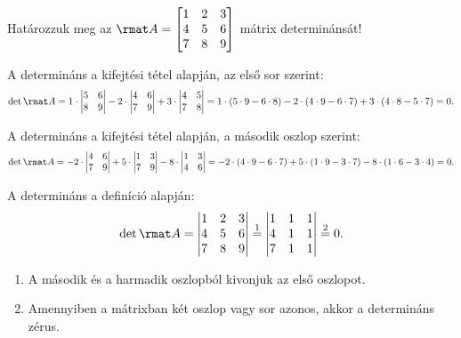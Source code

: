 \documentclass[a4paper, 12pt]{scrartcl}
\begin{document}
\begin{example}
  Határozzuk meg az $\rmat A = \begin{bmatrix}
      1 & 2 & 3 \\
      4 & 5 & 6 \\
      7 & 8 & 9
    \end{bmatrix}$ mátrix determinánsát!

  A determináns a kifejtési tétel alapján, az első sor szerint:
  $$
    \det \rmat A = 1 \cdot \begin{vmatrix}
      5 & 6 \\
      8 & 9
    \end{vmatrix} - 2 \cdot \begin{vmatrix}
      4 & 6 \\
      7 & 9
    \end{vmatrix} + 3 \cdot \begin{vmatrix}
      4 & 5 \\
      7 & 8
    \end{vmatrix}
    = 1 \cdot (5 \cdot 9 - 6 \cdot 8)
    - 2 \cdot (4 \cdot 9 - 6 \cdot 7)
    + 3 \cdot (4 \cdot 8 - 5 \cdot 7)
    = 0
    \text.
  $$

  A determináns a kifejtési tétel alapján, a második oszlop szerint:
  $$
    \det \rmat A = -2 \cdot \begin{vmatrix}
      4 & 6 \\
      7 & 9
    \end{vmatrix} +5 \cdot \begin{vmatrix}
      1 & 3 \\
      7 & 9
    \end{vmatrix} - 8 \cdot \begin{vmatrix}
      1 & 3 \\
      4 & 6
    \end{vmatrix}
    = -2 \cdot (4 \cdot 9 - 6 \cdot 7)
    + 5 \cdot (1 \cdot 9 - 3 \cdot 7)
    - 8 \cdot (1 \cdot 6 - 3 \cdot 4)
    = 0
    \text.
  $$

  A determináns a definíció alapján:
  $$
    \det \rmat A
    = \begin{vmatrix}
      1 & 2 & 3 \\
      4 & 5 & 6 \\
      7 & 8 & 9
    \end{vmatrix}
    \overset{1}{=} \begin{vmatrix}
      1 & 1 & 1 \\
      4 & 1 & 1 \\
      7 & 1 & 1
    \end{vmatrix}
    \overset{2}{=} 0
    \text.
  $$
  \begin{enumerate}
    \item A második és a harmadik oszlopból kivonjuk az első oszlopot.
    \item Amennyiben a mátrixban két oszlop vagy sor azonos, akkor a determináns
          zérus.
  \end{enumerate}
\end{example}
\end{document}
